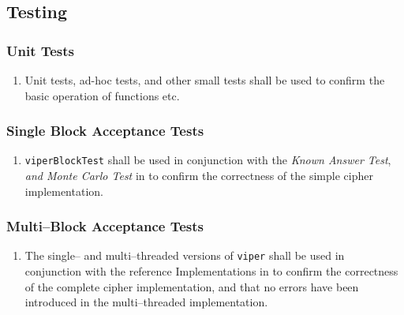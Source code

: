 \subsection{Testing}
\label{testing}
\subsubsection{Unit Tests}
\begin{enumerate}
\item Unit tests, ad-hoc tests, and other small tests shall be used to confirm the basic operation of functions etc.
\end{enumerate}


\subsubsection{Single Block Acceptance Tests}
\begin{enumerate}
\item \texttt{viperBlockTest} shall be used in conjunction with the \emph{Known Answer Test}, \emph{and Monte Carlo Test} in \cite{submission-files} to confirm the correctness of the simple cipher implementation.
\end{enumerate}

\subsubsection{Multi--Block Acceptance Tests}
\begin{enumerate}
\item The single-- and multi--threaded versions of \texttt{viper} shall be used in conjunction with the reference Implementations in \cite{submission-files, referenceImplementation} to confirm the correctness of the complete cipher implementation, and that no errors have been introduced in the multi--threaded implementation.
\end{enumerate}

